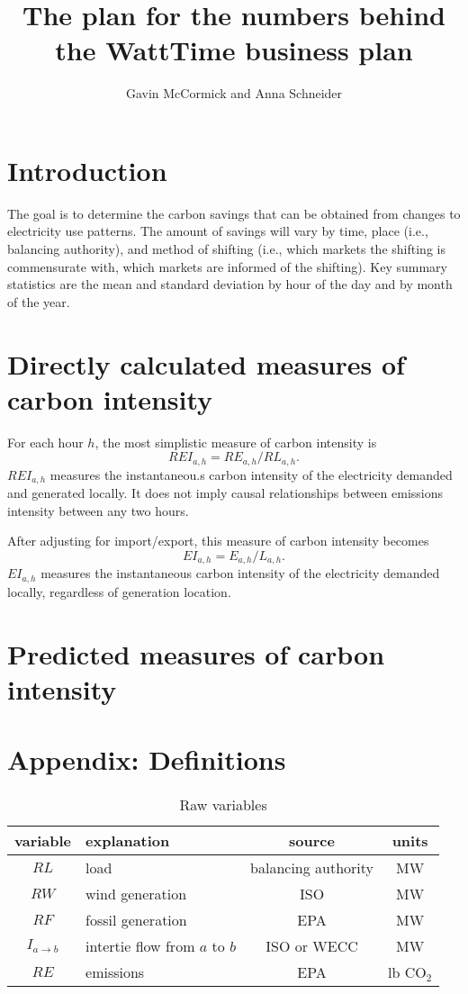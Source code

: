 \documentclass[11pt]{article}
\title{The plan for the numbers behind the WattTime business plan}
\author{Gavin McCormick and Anna Schneider}
\date{}                                           %
\begin{document}
\maketitle

\section{Introduction}
The goal is to determine the carbon savings that can be obtained from changes to electricity use patterns. The amount of savings will vary by time, place (i.e., balancing authority), and method of shifting (i.e., which markets the shifting is commensurate with, which markets are informed of the shifting). Key summary statistics are the mean and standard deviation by hour of the day and by month of the year.

\section{Directly calculated measures of carbon intensity}
For each hour $h$, the most simplistic measure of carbon intensity is
\begin{equation}
REI_{a,h} = RE_{a,h} / RL_{a,h}.
\end{equation}
$REI_{a,h}$ measures the instantaneou.s carbon intensity of the electricity demanded and generated locally. It does not imply causal relationships between emissions intensity between any two hours.

After adjusting for import/export, this measure of carbon intensity becomes
\begin{equation}
EI_{a,h} = E_{a,h} / L_{a,h}.
\end{equation}
$EI_{a,h}$ measures the instantaneous carbon intensity of the electricity demanded locally, regardless of generation location.

\section{Predicted measures of carbon intensity}

\section{Appendix: Definitions}

\begin{table}[htdp]
\caption{Raw variables}
\begin{center}
\begin{tabular}{clcc}
\hline
variable & explanation & source & units\\
\hline
$RL$ & load & balancing authority & MW \\
$RW$ & wind generation & ISO & MW \\
$RF$ & fossil generation & EPA & MW \\
$I_{a \rightarrow b}$ & intertie flow from $a$ to $b$ & ISO or WECC & MW \\
$RE$ & emissions & EPA & lb CO$_2$ \\
\hline
\end{tabular}
\end{center}
\label{default}
\end{table}
\end{document}
